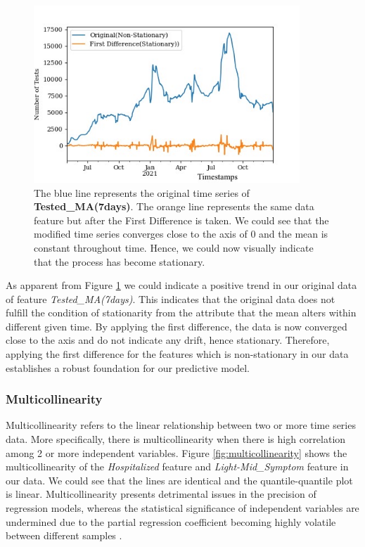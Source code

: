 \begin{figure}[!ht]
    \centering
    \includegraphics[width=10cm]{images/First_Difference.png}
    \caption{The blue line represents the original time series of \textbf{Tested\_MA(7days)}. The orange line represents the same data feature but after the First Difference is taken. We could see that the modified time series converges close to the axis of 0 and the mean is constant throughout time. Hence, we could now visually indicate that the process has become stationary.}
    \label{fig:First difference}
\end{figure}

As apparent from Figure \ref{fig:First difference} we could indicate a positive trend in our original data of feature \textit{Tested\_MA(7days)}. This indicates that the original data does not fulfill the condition of stationarity from the attribute that the mean alters within different given time. By applying the first difference, the data is now converged close to the axis and do not indicate any drift, hence stationary. Therefore, applying the first difference for the features which is non-stationary in our data establishes a robust foundation for our predictive model. 

\subsubsection{Multicollinearity}
Multicollinearity refers to the linear relationship between two or more time series data. More specifically, there is multicollinearity when there is high correlation among 2 or more independent variables. Figure \ref{fig:multicollinearity} shows the multicollinearity of the \textit{Hospitalized} feature and \textit{Light-Mid\_Symptom} feature in our data. We could see that the lines are identical and the quantile-quantile plot is linear. Multicollinearity presents detrimental issues in the precision of regression models, whereas the statistical significance of independent variables are undermined due to the partial regression coefficient becoming highly volatile between different samples \citep{multicollinearity_problem}.

